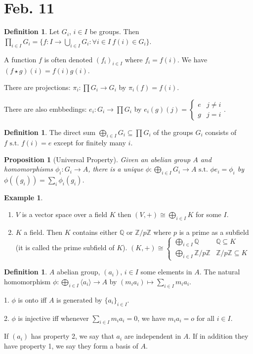 \documentclass{amsart}
\newtheorem{prop}[thm]{Proposition}
\theoremstyle{definition}
\newtheorem{definition}[thm]{Definition}
\newtheorem{example}[thm]{Example}
\newcommand{\Q}{\mathbb Q}
\newcommand{\Z}{\mathbb Z}
\newcommand{\st}{\text{ s.t. }}
\begin{document}
\section{Feb. 11}
\begin{definition}
Let $G_i$, $i\in I$ be groups. Then $\prod_{i\in I}G_i=\{f:I\to\bigcup\limits_{i\in I}G_i: \forall i\in I\ f(i)\in G_i\}$.

A function $f$ is often denoted $(f_i)_{i\in I}$ where $f_i=f(i)$. We have $(f\star g)(i)=f(i)g(i)$.

There are projections: $\pi_i:\prod G_i\to G_i$ by $\pi_i(f)=f(i)$.

There are also embbedings: $e_i:G_i\to \prod G_i$ by $e_i(g)(j)=\begin{cases}
	e&j\not=i\\g&j=i
\end{cases}$.	
\end{definition}
\begin{definition}
The direct sum $\bigoplus\limits_{i\in I}G_i\subseteq \prod G_i$ of the groups $G_i$ consists of $f\st f(i)=e$ except for finitely many $i$.	
\end{definition}
\begin{prop}[Universal Property]
	Given an abelian group $A$ and homomorphisms $\phi_i:G_i\to A$, there is a unique $\phi:\bigoplus\limits_{i\in I}G_i\to A\st \phi e_i=\phi_i$ by $\phi((g_i))=\sum_i\phi_i(g_i)$.
\end{prop}
\begin{example}
	\begin{enumerate}
		\item $V$ is a vector space over a field $K$ then $(V,+)\cong \bigoplus\limits_{i\in I}K$ for some $I$.
		\item $K$ a field. Then $K$ contains either $\Q$ or $\Z/p\Z$ where $p$ is a prime as a subfield (it is called the prime subfield of $K$). $(K,+)\cong\begin{cases}
			\bigoplus\limits_{i\in I}\Q&\Q\subseteq K\\
			\bigoplus\limits_{i\in I}\Z/p\Z&\Z/p\Z\subseteq K
		\end{cases}$	
	\end{enumerate}
\end{example}
\begin{definition}
	$A$ abelian group, $(a_i)$, $i\in I$ some elements in $A$. The natural homomorphism $\phi:\bigoplus\limits_{i\in I}\langle a_i\rangle \to A$ by $(m_ia_i)\mapsto \sum\limits_{i\in I}m_ia_i$.
	
	1. $\phi$ is onto iff $A$ is generated by $\{a_i\}_{i\in I}$.
	
	2. $\phi$ is injective iff whenever $\sum_{i\in I}m_ia_i=0$, we have $m_ia_i=o$ for all $i\in I$.
	
	If $(a_i)$ has property 2, we say that $a_i$ are independent in $A$. If in addition they have property 1, we say they form a basis of $A$.
\end{definition}
\end{document}
